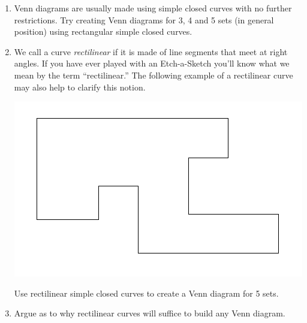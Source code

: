\begin{enumerate}
\item  Venn diagrams are usually made using simple closed curves 
with no further restrictions.  Try creating Venn diagrams for 3, 4 and
5 sets (in general position) using rectangular simple closed curves.


\wbvfill

\workbookpagebreak

\item  We call a curve \emph{rectilinear} if it is made
of line segments that meet at right angles.  If you have ever
played with an Etch-a-Sketch you'll know what we mean by the term 
``rectilinear.''  The following example of a rectilinear curve may
also help to clarify this notion.

\centerline{\includegraphics{figures/rectilinear}}

Use rectilinear
simple closed curves to create a Venn diagram for 5 sets.


\wbvfill

\workbookpagebreak
\hintspagebreak

\item  Argue as to why rectilinear curves will suffice to build
any Venn diagram.


\end{enumerate}
